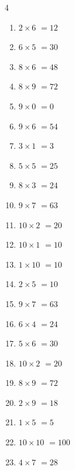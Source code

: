 \begin{multicols}{4}
\begin{enumerate}
  \item $2\times 6$
        $=12$

  \item $6\times 5$
        $=30$

  \item $8\times 6$
        $=48$

  \item $8\times 9$
        $=72$

  \item $9\times 0$
        $=0$

  \item $9\times 6$
        $=54$

  \item $3\times 1$
        $=3$

  \item $5\times 5$
        $=25$

  \item $8\times 3$
        $=24$

  \item $9\times 7$
        $=63$

  \item $10\times 2$
        $=20$

  \item $10\times 1$
        $=10$

\columnbreak %

  \item $1\times 10$
        $=10$

  \item $2\times 5$
        $=10$

  \item $9\times 7$
        $=63$

  \item $6\times 4$
        $=24$

  \item $5\times 6$
        $=30$

  \item $10\times 2$
        $=20$

  \item $8\times 9$
        $=72$

  \item $2\times 9$
        $=18$

  \item $1\times 5$
        $=5$

  \item $10\times 10$
        $=100$

  \item $4\times 7$
        $=28$


\end{enumerate}
\end{multicols}
